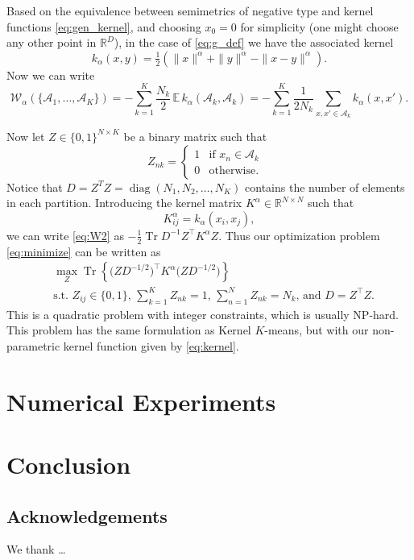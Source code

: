 \documentclass{article}
\DeclareMathOperator{\diag}{diag}
\DeclareMathOperator{\Tr}{Tr}
\begin{document}
Based on the equivalence between semimetrics of negative type
and kernel functions \eqref{eq:gen_kernel}, and choosing $x_0 = 0$ for
simplicity (one might choose any other point in $\mathbb{R}^D$),
in the case of \eqref{eq:g_def} we have the associated kernel
\begin{equation}\label{eq:kernel}
k_\alpha(x,y) = \tfrac{1}{2} \left( 
\| x \|^\alpha + \| y \|^\alpha - \| x-y \|^\alpha 
\right) .
\end{equation}
Now we can write
\begin{equation}\label{eq:W2}
\mathcal{W}_\alpha(\{ \mathcal{A}_1,\dotsc,\mathcal{A}_K \})
= - \sum_{k=1}^{K} \dfrac{N_k}{2} \, \mathbb{E} \, 
k_\alpha(\mathcal{A}_k, \mathcal{A}_k) = 
- \sum_{k=1}^{K} \dfrac{1}{2 N_k} \sum_{x, x' \in \mathcal{A}_k} 
k_\alpha(x, x').
\end{equation}

Now let $Z \in \{ 0,1 \}^{N\times K}$ be a binary matrix such
that 
\begin{equation}
Z_{nk} = \begin{cases}
1 & \mbox{if $x_n \in \mathcal{A}_k$ } \\
0 & \mbox{otherwise.}
\end{cases}
\end{equation}
Notice that $D = Z^T Z = \diag( N_1, N_2, \dotsc, N_K )$ contains the number
of elements in each partition. Introducing the kernel matrix
$K^{\alpha} \in \mathbb{R}^{N\times N}$ such that
\begin{equation}
K^{\alpha}_{ij} = k_\alpha(x_i, x_j),
\end{equation}
we can write \eqref{eq:W2} as
$- \tfrac{1}{2} \Tr D^{-1} Z^\top K^\alpha Z $. Thus our optimization problem
\eqref{eq:minimize} can be written as
\begin{equation}\label{eq:qcqp}
\begin{aligned}
& \max_{Z} \Tr\left\{ \big( Z D^{-1/2}\big)^\top K^{\alpha} 
\big( ZD^{-1/2} \big) 
\right\} \\
&\mbox{s.t. $Z_{ij} \in \{0,1\}$, $\sum_{k=1}^K Z_{nk} = 1$, 
$\sum_{n=1}^N Z_{nk} = N_k$, and $D = Z^\top Z$}.
\end{aligned}
\end{equation}
This is a quadratic problem with integer constraints, which is usually
NP-hard. This problem has the same formulation as Kernel $K$-means, but
with our non-parametric kernel function given by \eqref{eq:kernel}.


\section{Numerical Experiments}

\section{Conclusion}


\subsection*{Acknowledgements}
We thank \ldots




\end{document}
